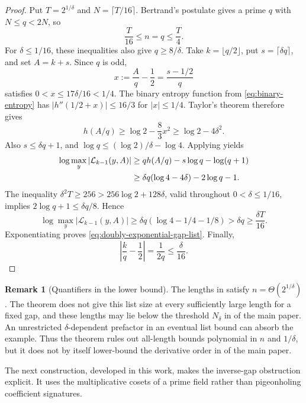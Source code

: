 \documentclass[11pt,letterpaper]{article}
\theoremstyle{definition}
\newtheorem{remark}[remark]{Remark}
\newcommand{\List}{\mathcal{L}}
\begin{document}
\begin{proof}
Put \(T=2^{1/\delta}\) and \(N=\lceil T/16\rceil\). Bertrand's postulate
gives a prime \(q\) with \(N\le q<2N\), so
\begin{equation}
  \frac{T}{16}\le n=q\le\frac{T}{4}.
  \label{eq:doubly-exponential-length}
\end{equation}
For \(\delta\le1/16\), these inequalities also give \(q\ge8/\delta\).
Take \(k=\lfloor q/2\rfloor\), put \(s=\lceil\delta q\rceil\), and set
\(A=k+s\). Since \(q\) is odd,
\[
  x:=\frac Aq-\frac12=\frac{s-1/2}{q}
\]
satisfies \(0<x\le17\delta/16<1/4\). The binary entropy function from
\eqref{eq:binary-entropy} has
\(|h''(1/2+x)|\le16/3\) for \(|x|\le1/4\). Taylor's theorem therefore gives
\[
  h(A/q)\ge\log2-\frac83x^2\ge\log2-4\delta^2.
\]
Also \(s\le\delta q+1\), and
\(\log q\le(\log2)/\delta-\log4\). Applying
 yields
\begin{align}
  \log\max_y|\List_{k-1}(y,A)|
  &\ge qh(A/q)-s\log q-\log(q+1) \notag\\
  &\ge\delta q(\log4-4\delta)-2\log q-1.
  \label{eq:doubly-exponential-entropy-step}
\end{align}
The inequality \(\delta^2T\ge256>256\log2+128\delta\), valid throughout
\(0<\delta\le1/16\), implies
\(2\log q+1\le\delta q/8\). Hence
\[
  \log\max_y|\List_{k-1}(y,A)|
  \ge\delta q(\log4-1/4-1/8)
  >\delta q
  \ge\frac{\delta T}{16}.
\]
Exponentiating proves \eqref{eq:doubly-exponential-gap-list}. Finally,
\[
  \left|\frac kq-\frac12\right|=\frac1{2q}\le\frac{\delta}{16}.
\]
\end{proof}

\begin{remark}[Quantifiers in the lower bound]
\label{rem:doubly-exponential-quantifiers}
The lengths in  satisfy
\(n=\Theta(2^{1/\delta})\). The theorem does not give this list size at
every sufficiently large length for a fixed gap, and these lengths may lie
below the threshold \(N_\delta\) in  of the main paper. An unrestricted
\(\delta\)-dependent prefactor in an eventual list bound can absorb the
example. Thus the theorem rules out all-length bounds polynomial in
\(n\) and \(1/\delta\), but it does not by itself lower-bound the derivative
order in  of the main paper.
\end{remark}

The next construction, developed in this work, makes the inverse-gap
obstruction explicit. It uses the multiplicative cosets of a prime field
rather than pigeonholing coefficient signatures.
\end{document}
